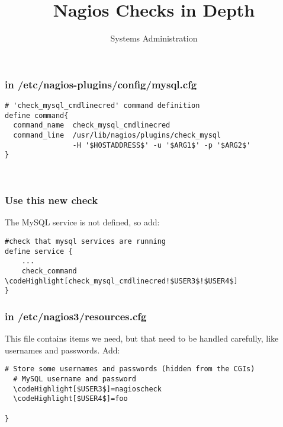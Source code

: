 \documentclass[10pt]{beamer}
\title{Nagios Checks in Depth}
\author[IN719]{Systems Administration}
\institute[Otago Polytechnic]{
  School of Information Technology \\
  Otago Polytechnic \\
  Dunedin, New Zealand \\
}
\date{}
\newcommand\codeHighlight[1]{\textcolor[rgb]{1,0,0}{\textbf{#1}}}
\begin{document}
\begin{frame}[plain]
  \titlepage
\end{frame}


\begin{frame}[fragile]
  \frametitle{in /etc/nagios-plugins/config/mysql.cfg}

\begin{Verbatim}[commandchars=\\\[\]]
# 'check_mysql_cmdlinecred' command definition
define command{
  command_name  check_mysql_cmdlinecred
  command_line  /usr/lib/nagios/plugins/check_mysql
                -H '$HOSTADDRESS$' -u '$ARG1$' -p '$ARG2$'
}



\end{Verbatim}
\end{frame}
\begin{frame}[fragile]
  \frametitle{Use this new check}

The MySQL service is not defined, so add:
\begin{Verbatim}[commandchars=\\\[\]]
#check that mysql services are running
define service {
	...
    check_command    \codeHighlight[check_mysql_cmdlinecred!$USER3$!$USER4$]
}

\end{Verbatim}
\end{frame}

\begin{frame}[fragile]
  \frametitle{in /etc/nagios3/resources.cfg}

This file contains items we need, but that need to be handled carefully, like
usernames and passwords.  Add:

\begin{Verbatim}[commandchars=\\\[\]]
  # Store some usernames and passwords (hidden from the CGIs)
  # MySQL username and password
  \codeHighlight[$USER3$]=nagioscheck
  \codeHighlight[$USER4$]=foo

}
\end{Verbatim}
\end{frame}
\end{document}
